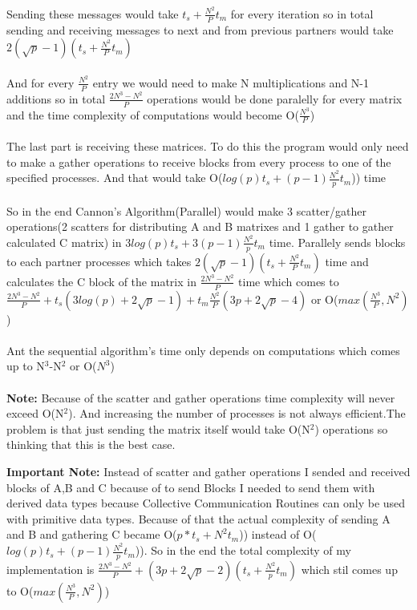 \\
Sending these messages would take $t_s+\frac{N^2}{P}t_m$ for every iteration so in total sending and receiving messages to next and from previous partners would take $2(\sqrt{p}-1)(t_s+\frac{N^2}{P}t_m)$\\
\\
And for every $\frac{N^2}{P}$ entry we would need to make N multiplications and N-1 additions so in total $\frac{2N^3-N^2}{P}$ operations would be done paralelly for every matrix and the time complexity of computations would become O($\frac{N^3}{P}$)\\
\\
The last part is receiving these matrices. To do this the program would only need to make a gather operations to receive blocks from every process to one of the specified processes. And that would take O(\(log(p)t_s+(p-1)\frac{N^2}{p}t_m\))) time\\
\\
So in the end Cannon's Algorithm(Parallel) would make 3 scatter/gather operations(2 scatters for distributing A and B matrixes and 1 gather to gather calculated C matrix) in \(3log(p)t_s+3(p-1)\frac{N^2}{p}t_m\) time. Parallely sends blocks to each partner processes which takes $2(\sqrt{p}-1)(t_s+\frac{N^2}{P}t_m)$ time and calculates the C block of the matrix in $\frac{2N^3-N^2}{P}$ time which comes to \(\frac{2N^3-N^2}{P}+t_s(3log(p)+2\sqrt{p}-1)+t_m\frac{N^2}{P}(3p+2\sqrt{p}-4)\) or O(\(max(\frac{N^3}{P},N^2)\))\\
\\
Ant the sequential algorithm's time only depends on computations which comes up to N$^3$-N$^2$ or O($N^3$)\\
\\
\textbf{Note:} Because of the scatter and gather operations time complexity will never exceed O(N$^2$). And increasing the number of processes is not always efficient.The problem is that just sending the matrix itself would take O(N$^2$) operations so thinking that this is the best case.

\textbf{Important Note:} Instead of scatter and gather operations I sended and received blocks of A,B and C because of to send Blocks I needed to send them with derived data types because Collective Communication Routines can only be used with primitive data types. Because of that the actual complexity of sending A and B and gathering C became O(\(p*t_s+N^2t_m\))) instead of O(\(log(p)t_s+(p-1)\frac{N^2}{p}t_m\))). So in the end the total complexity of my implementation is \(\frac{2N^3-N^2}{P}+(3p+2\sqrt{p}-2)(t_s+\frac{N^2}{p}t_m)\) which stil comes up to O(\(max(\frac{N^3}{P},N^2)\))